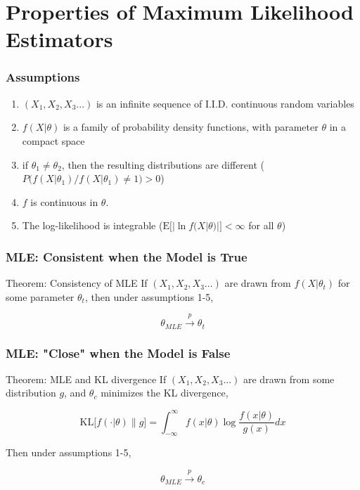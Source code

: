 \documentclass[12pt, block=fill]{beamer}
\newcommand{\E}{\text{E}}
\begin{document}
\section{Properties of Maximum Likelihood Estimators}


\begin{frame}
  \frametitle{Assumptions}

  \begin{enumerate}
\item   $(X_1, X_2, X_3...)$ is an infinite sequence of I.I.D. continuous random variables
\item  $f(X|\theta)$ is a family of probability density functions, with parameter $\theta$ in a compact space
\item if $\theta_1 \neq \theta_2$, then the resulting distributions are different ($P\big(f(X|\theta_1)/f(X|\theta_1) \neq 1 \big) >0$)
\item $f$ is continuous in $\theta$.
\item The log-likelihood is integrable ($\E\big[ | \ln f(X|\theta) | \big] < \infty$ for all $\theta$)
\end{enumerate}
\end{frame}



\begin{frame}
\frametitle{MLE: Consistent when the Model is True}
\begin{block}{Theorem: Consistency of MLE}
If $(X_1, X_2, X_3...)$ are drawn from $f(X|\theta_t)$ for some parameter $\theta_t$, then under assumptions 1-5,

$$\theta_{MLE} \overset{p}{\rightarrow} \theta_t$$
\end{block}
\end{frame}

\begin{frame}
\frametitle{MLE: "Close" when the Model is False}
\begin{block}{Theorem: MLE and KL divergence}
If $(X_1, X_2, X_3...)$ are drawn from some distribution $g$, and $\theta_c$ minimizes the KL divergence,

$$\text{KL} \big[f(\cdot| \theta) \| g  \big] = \int_{-\infty}^\infty f( x | \theta) \log \frac{ f( x | \theta)}{g(x)}dx$$

Then under assumptions 1-5,

$$\theta_{MLE} \overset{p}{\rightarrow} \theta_c$$
\end{block}
\end{frame}
\end{document}
